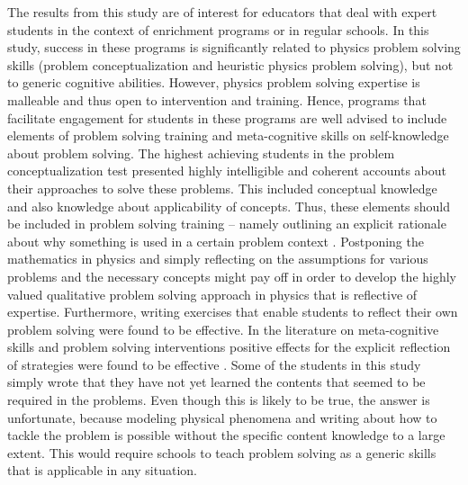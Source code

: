 \documentclass[D:/studies/WinnerS/Erhebungen/IPhO1718/paper/problem_solving/main/TaylorFrancis/interactapasample]{subfiles}
\begin{document}
The results from this study are of interest for educators that deal with expert students in the context of enrichment programs or in regular schools. In this study, success in these programs is significantly related to physics problem solving skills (problem conceptualization and heuristic physics problem solving), but not to generic cognitive abilities. However, physics problem solving expertise is malleable and thus open to intervention and training. Hence, programs that facilitate engagement for students in these programs are well advised to include elements of problem solving training and meta-cognitive skills on self-knowledge about problem solving. The highest achieving students in the problem conceptualization test presented highly intelligible and coherent accounts about their approaches to solve these problems. This included conceptual knowledge and also knowledge about applicability of concepts. Thus, these elements should be included in problem solving training -- namely outlining an explicit rationale about why something is used in a certain problem context \citep{Fortus.2009}. Postponing the mathematics in physics and simply reflecting on the assumptions for various problems and the necessary concepts might pay off in order to develop the highly valued qualitative problem solving approach in physics that is reflective of expertise. Furthermore, writing exercises that enable students to reflect their own problem solving were found to be effective. In the literature on meta-cognitive skills and problem solving interventions positive effects for the explicit reflection of strategies were found to be effective \citep[e.g.,][]{Bransford.1986,Mason.2010,Perels.2005}. Some of the students in this study simply wrote that they have not yet learned the contents that seemed to be required in the problems. Even though this is likely to be true, the answer is unfortunate, because modeling physical phenomena and writing about how to tackle the problem is possible without the specific content knowledge to a large extent. This would require schools to teach problem solving as a generic skills that is applicable in any situation.
\end{document}
